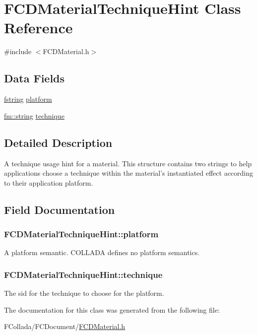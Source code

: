\hypertarget{classFCDMaterialTechniqueHint}{
\section{FCDMaterialTechniqueHint Class Reference}
\label{classFCDMaterialTechniqueHint}
}


{\ttfamily \#include $<$FCDMaterial.h$>$}

\subsection*{Data Fields}
\begin{DoxyCompactItemize}
\item 
\hyperlink{classfm_1_1stringT}{fstring} \hyperlink{classFCDMaterialTechniqueHint_a989eee193086807edd2729859ca755aa}{platform}
\item 
\hyperlink{classfm_1_1stringT}{fm::string} \hyperlink{classFCDMaterialTechniqueHint_a7fdc8336e10d168d95e046e423154285}{technique}
\end{DoxyCompactItemize}


\subsection{Detailed Description}
A technique usage hint for a material. This structure contains two strings to help applications choose a technique within the material's instantiated effect according to their application platform. 

\subsection{Field Documentation}
\hypertarget{classFCDMaterialTechniqueHint_a989eee193086807edd2729859ca755aa}{
\subsubsection[{platform}]{ {\bf FCDMaterialTechniqueHint::platform}}}
\label{classFCDMaterialTechniqueHint_a989eee193086807edd2729859ca755aa}
A platform semantic. COLLADA defines no platform semantics. \hypertarget{classFCDMaterialTechniqueHint_a7fdc8336e10d168d95e046e423154285}{
\subsubsection[{technique}]{ {\bf FCDMaterialTechniqueHint::technique}}}
\label{classFCDMaterialTechniqueHint_a7fdc8336e10d168d95e046e423154285}
The sid for the technique to choose for the platform. 

The documentation for this class was generated from the following file:\begin{DoxyCompactItemize}
\item 
FCollada/FCDocument/\hyperlink{FCDMaterial_8h}{FCDMaterial.h}\end{DoxyCompactItemize}
